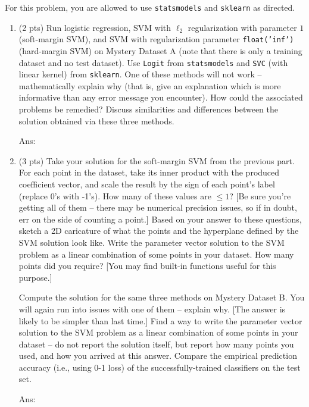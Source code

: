 \documentclass[10pt,letter,notitlepage]{article}
\newcommand{\ans}[1]{{\color{orange}\textsf{Ans}: #1}}
\newcounter{exercise}
\begin{document}
\begin{exercise}
For this problem, you are allowed to use \texttt{statsmodels} and \texttt{sklearn} as directed.
\begin{enumerate}
\item (2 pts) Run logistic regression, SVM with $\ell_2$ regularization with parameter $1$ (soft-margin SVM), and SVM with regularization parameter \texttt{float('inf')} (hard-margin SVM) on Mystery Dataset A (note that there is only a training dataset and no test dataset). Use \texttt{Logit} from \texttt{statsmodels} and \texttt{SVC} (with linear kernel) from \texttt{sklearn}.
One of these methods will not work -- mathematically explain why (that is, give an explanation which is more informative than any error message you encounter).
How could the associated problems be remedied?
Discuss similarities and differences between the solution obtained via these three methods. 

\ans{} 

\item (3 pts) Take your solution for the soft-margin SVM from the previous part.
For each point in the dataset, take its inner product with the produced coefficient vector, and scale the result by the sign of each point's label (replace 0's with -1's). How many of these values are $\leq 1$? [Be sure you're getting all of them -- there may be numerical precision issues, so if in doubt, err on the side of counting a point.]
Based on your answer to these questions, sketch a 2D caricature of what the points and the hyperplane defined by the SVM solution look like.
Write the parameter vector solution to the SVM problem as a linear combination of some points in your dataset.
How many points did you require?
[You may find built-in functions useful for this purpose.]

Compute the solution for the same three methods on Mystery Dataset B. 
You will again run into issues with one of them -- explain why. [The answer is likely to be simpler than last time.]
Find a way to write the parameter vector solution to the SVM problem as a linear combination of some points in your dataset -- do not report the solution itself, but report how many points you used, and how you arrived at this answer.
Compare the empirical prediction accuracy (i.e., using 0-1 loss) of the successfully-trained classifiers on the test set. 

\ans{} 

\end{enumerate}
\end{exercise}
\end{document}
